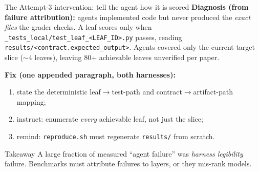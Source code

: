 \documentclass[aspectratio=169]{beamer}
\begin{document}
\begin{frame}{The Attempt-3 intervention: tell the agent how it is scored}
  \textbf{Diagnosis (from failure attribution):} agents implemented code but never produced
  the \emph{exact files} the grader checks. A leaf scores only when
  \texttt{\_tests\_local/test\_leaf\_<LEAF\_ID>.py} passes, reading
  \texttt{results/<contract.expected\_output>}. Agents covered only the current
  target slice ($\sim$4 leaves), leaving 80+ achievable leaves unverified per paper.
  \vspace{0.6em}

  \textbf{Fix (one appended paragraph, both harnesses):}
  \begin{enumerate}
    \item state the deterministic leaf$\rightarrow$test-path and contract$\rightarrow$artifact-path mapping;
    \item instruct: enumerate \emph{every} achievable leaf, not just the slice;
    \item remind: \texttt{reproduce.sh} must regenerate \texttt{results/} from scratch.
  \end{enumerate}
  \vspace{0.6em}
  \begin{block}{Takeaway}
    A large fraction of measured ``agent failure'' was \emph{harness legibility} failure.
    Benchmarks must attribute failures to layers, or they mis-rank models.
  \end{block}
\end{frame}
\end{document}
